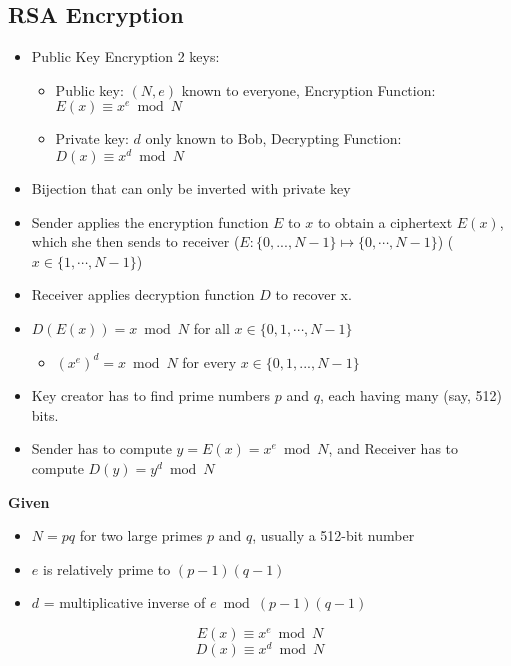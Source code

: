 \documentclass{article}\usepackage{amsmath,amssymb,amsthm,tikz,tkz-graph,color,chngpage,soul,hyperref,csquotes,graphicx,floatrow, listings,polynom}\newcommand*{\QEDB}{\hfill\ensuremath{\square}}\newtheorem*{prop}{Proposition}\renewcommand{\theenumi}{\alph{enumi}}\usepackage[shortlabels]{enumitem}\usepackage[nobreak=true]{mdframed}\usetikzlibrary{matrix,calc}\MakeOuterQuote{"}\usepackage[margin=0.75in]{geometry} \newtheorem{theorem}{Theorem}\newcommand{\Z}{\mathbb Z}\newcommand{\R}{\mathbb R}\newcommand{\Q}{\mathbb Q}\newcommand{\N}{\mathbb N}\newcommand{\x}[1]{\textrm{ #1 }}\newcommand{\pr}{\textrm{Pr}}
\newcommand{\eq}[1]{\begin{equation}#1\end{equation}}
\begin{document}
\pagebreak

\subsection*{RSA Encryption}
\begin{itemize}
    \item Public Key Encryption 2 keys:
    \begin{itemize}
        \item Public key: $(N, e)$ known to everyone, Encryption Function: $E(x) \equiv x^e \bmod N$
        \item Private key: $d$ only known to Bob, Decrypting Function: $D(x) \equiv x^d \bmod N$
    \end{itemize}
    \item Bijection that can only be inverted with private key
    \item Sender applies the encryption function $E$ to $x$ to obtain a ciphertext $E(x)$, which she then sends to receiver ($E : \{0,...,N-1\} \mapsto \{0,\cdots,N-1\}$) ($x \in \{1,\cdots,N-1\}$)
    \item Receiver applies decryption function $D$ to recover x.
    \item $D(E(x)) = x \bmod N$ for all $x \in \{0,1,\cdots,N-1\}$
    \begin{itemize}
        \item $(x^e)^d = x \bmod N$ for every $x \in \{0,1,...,N-1\}$
    \end{itemize}
    \item Key creator has to find prime numbers $p$ and $q$, each having many (say, 512) bits.
    \item Sender has to compute $y=E(x)=x^e \bmod N$, and Receiver has to compute $D(y)= y^d \bmod N$
\end{itemize}
\begin{mdframed}
\textbf{Given}
\begin{itemize}
    \item $N = pq$ for two large primes $p$ and $q$, usually a 512-bit number
    \item $e$ is relatively prime to $(p-1)(q-1)$
    \item $d$ = multiplicative inverse of $e \bmod (p-1)(q-1)$
\end{itemize}
\eq{E(x) \equiv x^e \bmod N}
\eq{D(x) \equiv x^d \bmod N}
\end{mdframed}
\end{document}
